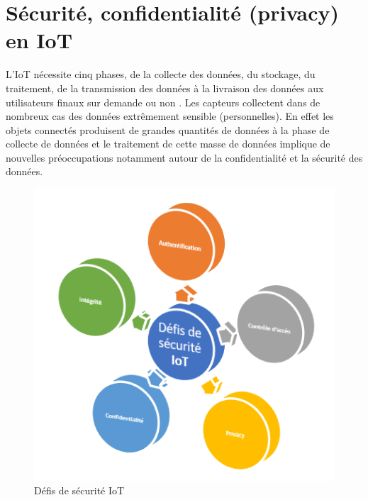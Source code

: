 	\section{Sécurité, conf{\kern0pt}identialité (privacy) en IoT}
L’IoT nécessite cinq phases, de la collecte des données, du stockage, du traitement, de la transmission des données à la livraison des données aux utilisateurs f{\kern0pt}inaux sur demande ou non \cite{hu2016security}. Les capteurs collectent dans de nombreux cas des données extrêmement sensible (personnelles). En ef{\kern0pt}fet les objets connectés produisent de grandes quantités de données à la phase de collecte de données et le traitement de cette masse de données implique de nouvelles préoccupations notamment autour de la conf{\kern0pt}identialité et la sécurité des données.
	\begin{figure}[H]
		\begin{center}
			\includegraphics[width=\textwidth]{IMAGES/ORIGINALS/Défis_de_sécurité_IoT}
		\end{center}
		\caption{Déf{\kern0pt}is de sécurité IoT}
	\end{figure}

